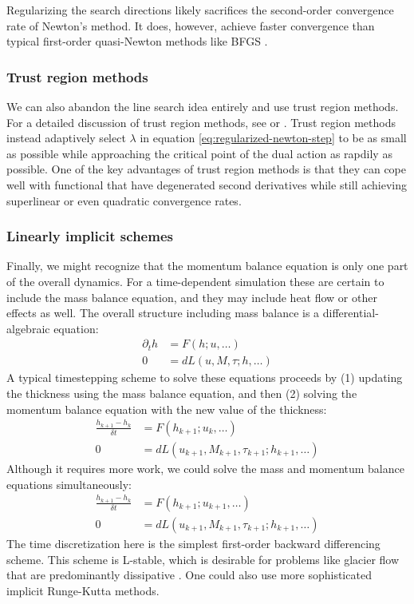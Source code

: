 \documentclass[review,oneside]{igs}
\begin{document}
Regularizing the search directions likely sacrifices the second-order convergence rate of Newton's method.
It does, however, achieve faster convergence than typical first-order quasi-Newton methods like BFGS \citep{nocedal2006numerical}.

\subsubsection{Trust region methods}

We can also abandon the line search idea entirely and use trust region methods.
For a detailed discussion of trust region methods, see \citet{nocedal2006numerical} or \citet{conn2000trust}.
Trust region methods instead adaptively select $\lambda$ in equation \eqref{eq:regularized-newton-step} to be as small as possible while approaching the critical point of the dual action as rapdily as possible.
One of the key advantages of trust region methods is that they can cope well with functional that have degenerated second derivatives while still achieving superlinear or even quadratic convergence rates.

\subsubsection{Linearly implicit schemes}
\label{subsec:linearly-implicit-schemes}

Finally, we might recognize that the momentum balance equation is only one part of the overall dynamics.
For a time-dependent simulation these are certain to include the mass balance equation, and they may include heat flow or other effects as well.
The overall structure including mass balance is a differential-algebraic equation:
\begin{align}
    \partial_th & = F(h; u, \ldots) \\
    0 & = dL(u, M, \tau; h, \ldots)
\end{align}
A typical timestepping scheme to solve these equations proceeds by (1) updating the thickness using the mass balance equation, and then (2) solving the momentum balance equation with the new value of the thickness:
\begin{align}
    \frac{h_{k + 1} - h_k}{\delta t} & = F(h_{k + 1}; u_k, \ldots) \\
    0 & = dL(u_{k + 1}, M_{k + 1}, \tau_{k + 1}; h_{k + 1}, \ldots)
\end{align}
Although it requires more work, we could solve the mass and momentum balance equations simultaneously:
\begin{align}
    \frac{h_{k + 1} - h_k}{\delta t} & = F(h_{k + 1}; u_{k + 1}, \ldots) \\
    0 & = dL(u_{k + 1}, M_{k + 1}, \tau_{k + 1}; h_{k + 1}, \ldots)
\end{align}
The time discretization here is the simplest first-order backward differencing scheme.
This scheme is L-stable, which is desirable for problems like glacier flow that are predominantly dissipative \citep{wanner1996solving}.
One could also use more sophisticated implicit Runge-Kutta methods.
\end{document}
